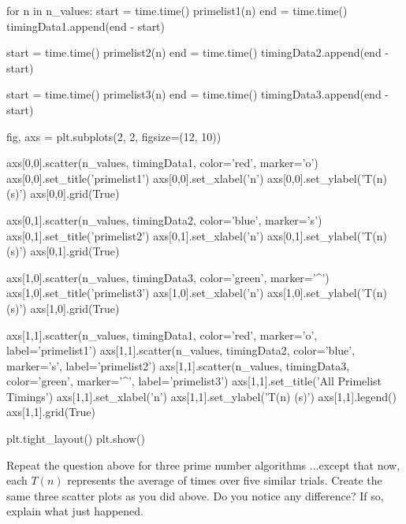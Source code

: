 \documentclass[11pt,twoside,openany]{memoir}
\begin{document}
\begin{solution}
\begin{python}
for n in n_values:
    start = time.time()
    primelist1(n)
    end = time.time()
    timingData1.append(end - start)

    start = time.time()
    primelist2(n)
    end = time.time()
    timingData2.append(end - start)

    start = time.time()
    primelist3(n)
    end = time.time()
    timingData3.append(end - start)

fig, axs = plt.subplots(2, 2, figsize=(12, 10))

axs[0,0].scatter(n_values, timingData1, color='red', marker='o')
axs[0,0].set_title('primelist1')
axs[0,0].set_xlabel('n')
axs[0,0].set_ylabel('T(n) (s)')
axs[0,0].grid(True)

axs[0,1].scatter(n_values, timingData2, color='blue', marker='s')
axs[0,1].set_title('primelist2')
axs[0,1].set_xlabel('n')
axs[0,1].set_ylabel('T(n) (s)')
axs[0,1].grid(True)

axs[1,0].scatter(n_values, timingData3, color='green', marker='^')
axs[1,0].set_title('primelist3')
axs[1,0].set_xlabel('n')
axs[1,0].set_ylabel('T(n) (s)')
axs[1,0].grid(True)

axs[1,1].scatter(n_values, timingData1, color='red', marker='o', label='primelist1')
axs[1,1].scatter(n_values, timingData2, color='blue', marker='s', label='primelist2')
axs[1,1].scatter(n_values, timingData3, color='green', marker='^', label='primelist3')
axs[1,1].set_title('All Primelist Timings')
axs[1,1].set_xlabel('n')
axs[1,1].set_ylabel('T(n) (s)')
axs[1,1].legend()
axs[1,1].grid(True)

plt.tight_layout()
plt.show()
                \end{python}

        \end{solution}
    \newpage
    \begin{problem}
        Repeat the question above for three prime number algorithms ...except that now, each $T(n)$ represents the average of times over five similar trials. Create the same three scatter plots as you did above. Do you notice any difference? If so, explain what just happened. 
    \end{problem}
\end{document}
